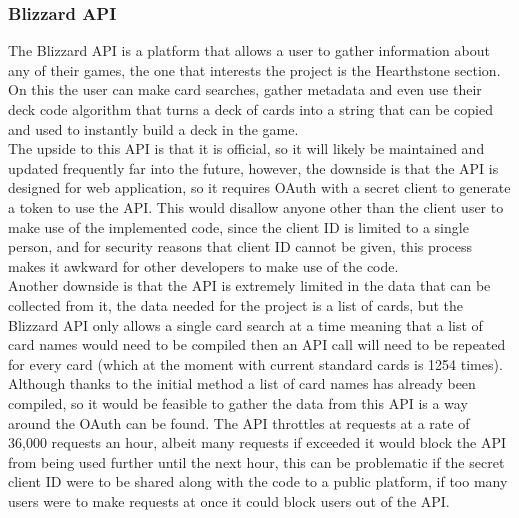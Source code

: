 \documentclass{report} %
\begin{document}
\subsubsection{Blizzard API}
The Blizzard API is a platform that allows a user to gather information about any of their games, the one that interests the project is the Hearthstone section. On this the user can make card searches, gather metadata and even use their deck code algorithm that turns a deck of cards into a string that can be copied and used to instantly build a deck in the game. \\
\indent The upside to this API is that it is official, so it will likely be maintained and updated frequently far into the future, however, the downside is that the API is designed for web application, so it requires OAuth with a secret client to generate a token to use the API. This would disallow anyone other than the client user to make use of the implemented code, since the client ID is limited to a single person, and for security reasons that client ID cannot be given, this process makes it awkward for other developers to make use of the code. \\
\indent Another downside is that the API is extremely limited in the data that can be collected from it, the data needed for the project is a list of cards, but the Blizzard API only allows a single card search at a time meaning that a list of card names would need to be compiled then an API call will need to be repeated for every card (which at the moment with current standard cards is 1254 times). Although thanks to the initial method a list of card names has already been compiled, so it would be feasible to gather the data from this API is a way around the OAuth can be found. The API throttles at requests at a rate of 36,000 requests an hour, albeit many requests if exceeded it would block the API from being used further until the next hour, this can be problematic if the secret client ID were to be shared along with the code to a public platform, if too many users were to make requests at once it could block users out of the API.
\end{document}
